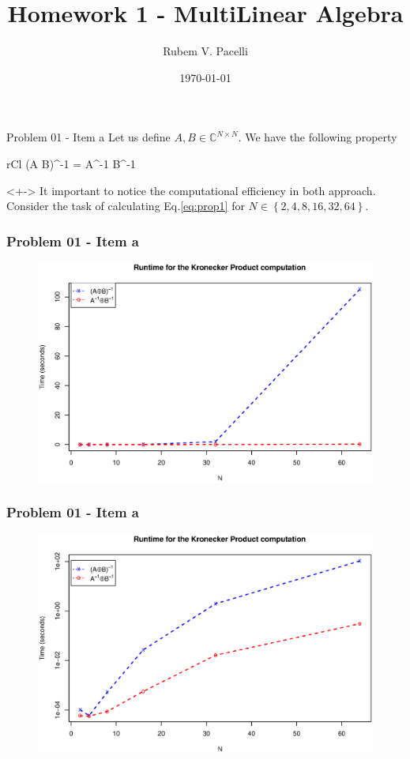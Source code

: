 \documentclass[12pt, aspectratio=169]{beamer}
\title{Homework 1 - MultiLinear Algebra}
\author{Rubem V. Pacelli}
\institute{Federal University of Ceará}
\date{\today}
\newcommand{\Complex}{\mathbb{C}}
\begin{document}
 

\begin{frame}[<+->][t]{Problem 01 - Item a}
	Let us define \(A,B \in \Complex^{N\times N}\). We have the following property
	\begin{IEEEeqnarray}{rCl}
		(A \otimes B)^{-1} = A^{-1} \otimes B^{-1}
		\label{eq:prop1}
	\end{IEEEeqnarray}
	\begin{visibleenv}<+->
		It important to notice the computational efficiency in both approach. Consider the task of calculating Eq.\eqref{eq:prop1} for \(N\in \left\{2, 4, 8, 16, 32, 64\right\}\).
	\end{visibleenv}
\end{frame}

\begin{frame}
	\frametitle{Problem 01 - Item a}
	\begin{figure}
		\includegraphics[scale=0.4]{figs/1a_norm.eps}
	\end{figure}
\end{frame}

\begin{frame}
	\frametitle{Problem 01 - Item a}
	\begin{figure}
		\includegraphics[scale=0.4]{figs/1a_log.eps}
	\end{figure}
\end{frame}
\end{document}
